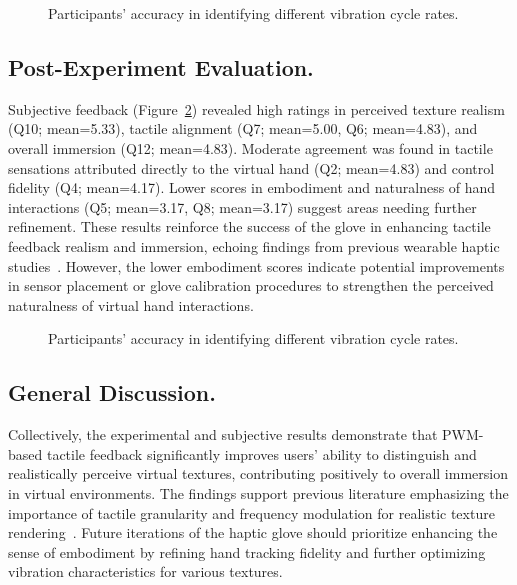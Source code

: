 \documentclass[graybox]{svmult}
\begin{document}
\begin{figure}[H]
	\centering
	
	\caption{Participants' accuracy in identifying different vibration cycle rates.}\label{fig:ex2_results}
\end{figure}


\subsection{Post-Experiment Evaluation.} 

Subjective feedback (Figure~\ref{fig:questionnaire_results}) revealed high ratings in perceived texture realism (Q10; mean=5.33), tactile alignment (Q7; mean=5.00, Q6; mean=4.83), and overall immersion (Q12; mean=4.83). Moderate agreement was found in tactile sensations attributed directly to the virtual hand (Q2; mean=4.83) and control fidelity (Q4; mean=4.17). Lower scores in embodiment and naturalness of hand interactions (Q5; mean=3.17, Q8; mean=3.17) suggest areas needing further refinement. These results reinforce the success of the glove in enhancing tactile feedback realism and immersion, echoing findings from previous wearable haptic studies~\cite{pacchierotti2017wearable}. However, the lower embodiment scores indicate potential improvements in sensor placement or glove calibration procedures to strengthen the perceived naturalness of virtual hand interactions.

\begin{figure}\centering
	
	\caption{Participants' accuracy in identifying different vibration cycle rates.}\label{fig:questionnaire_results}
\end{figure}

\subsection{General Discussion.}  

Collectively, the experimental and subjective results demonstrate that PWM-based tactile feedback significantly improves users' ability to distinguish and realistically perceive virtual textures, contributing positively to overall immersion in virtual environments. The findings support previous literature emphasizing the importance of tactile granularity and frequency modulation for realistic texture rendering~\cite{strohmeier2017generating,bach2023enhanced}. Future iterations of the haptic glove should prioritize enhancing the sense of embodiment by refining hand tracking fidelity and further optimizing vibration characteristics for various textures.
\end{document}
